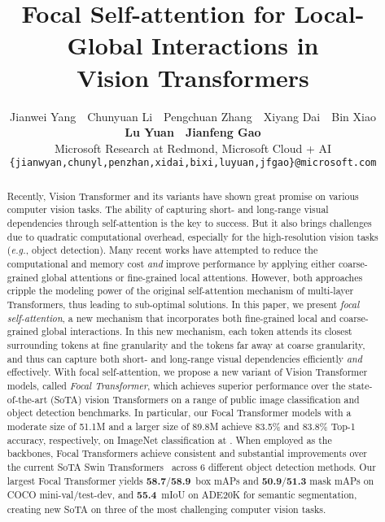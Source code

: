 \documentclass{article}
\title{Focal Self-attention for Local-Global Interactions in \\ Vision Transformers}
\author{Jianwei Yang \,\, Chunyuan Li \,\, Pengchuan Zhang \,\, Xiyang Dai \,\, Bin Xiao \\ 
  \textbf{Lu Yuan} \,\, \textbf{Jianfeng Gao} \\
  Microsoft Research at Redmond, Microsoft Cloud + AI\\
  \texttt{\{jianwyan,chunyl,penzhan,xidai,bixi,luyuan,jfgao\}@microsoft.com} \\
}
\newcommand{\cocominivalboxmapms}{\textbf{58.7}}
\newcommand{\cocotestdevboxmapms}{\textbf{58.9}}
\newcommand{\adevalms}{\textbf{55.4}}
\begin{document}
\maketitle

\begin{abstract}
    Recently, Vision Transformer and its variants have shown great promise on various computer vision tasks. The ability of capturing short- and long-range visual dependencies through self-attention is  the key to success. But it also brings challenges due to quadratic computational overhead, especially for the high-resolution vision tasks (\textit{e.g.}, object detection). Many recent works have attempted to reduce the computational and memory cost \emph{and} improve performance by applying either coarse-grained global attentions or fine-grained local attentions. However, both approaches cripple the modeling power of the original self-attention mechanism of multi-layer Transformers, thus leading to sub-optimal solutions. In this paper, we present \emph{focal self-attention}, a new mechanism that incorporates both fine-grained local and coarse-grained global interactions. In this new mechanism, each token attends its closest surrounding tokens at fine granularity and the tokens far away at coarse granularity, and thus can capture both short- and long-range visual dependencies efficiently \textit{and} effectively. With focal self-attention, we propose a new variant of Vision Transformer models, called \emph{Focal Transformer}, which achieves superior performance over the state-of-the-art (SoTA) vision Transformers on a range of public image classification and object detection benchmarks. In particular, our Focal Transformer models with a moderate size of 51.1M and a larger size of 89.8M achieve 83.5\% and 83.8\% Top-1 accuracy, respectively, on ImageNet classification at . When employed as the backbones, Focal Transformers achieve consistent and substantial improvements over the current SoTA Swin Transformers~\cite{liu2021swin} across 6 different object detection methods. Our largest Focal Transformer yields \cocominivalboxmapms/\cocotestdevboxmapms~box mAPs and \textbf{50.9}/\textbf{51.3} mask mAPs on COCO mini-val/test-dev, and \adevalms~mIoU on ADE20K for semantic segmentation, creating new SoTA on three of the most challenging computer vision tasks.


  
\end{abstract}
\end{document}
